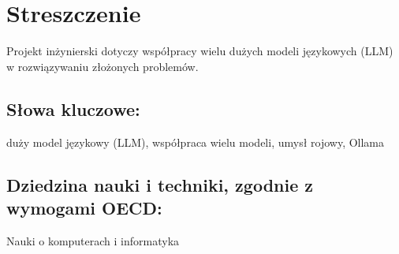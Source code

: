 \chapter*{Streszczenie}
{}

Projekt inżynierski dotyczy współpracy wielu dużych modeli językowych (LLM) w rozwiązywaniu złożonych problemów.

\section*{Słowa kluczowe:}
\noindent duży model językowy (LLM), współpraca wielu modeli, umysł rojowy, Ollama
\section*{Dziedzina nauki i techniki, zgodnie z wymogami OECD:}
\noindent Nauki o komputerach i informatyka
